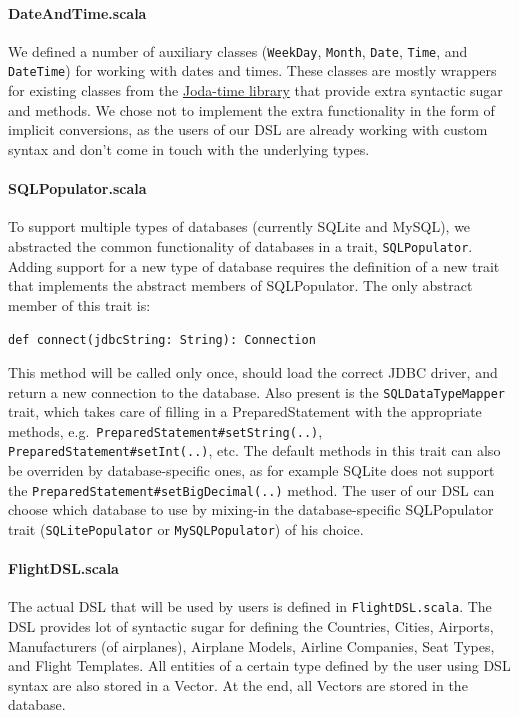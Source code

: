 \documentclass[a4paper]{article}
\newcommand{\cc}[1]{\texttt{#1}}
\renewcommand{\sc}[1]{\lstinline{#1}}
\begin{document}
\paragraph{DateAndTime.scala}
We defined a number of auxiliary classes (\cc{WeekDay}, \cc{Month}, \cc{Date}, \cc{Time}, and \cc{DateTime}) for working with dates and times.
These classes are mostly wrappers for existing classes from the \href{http://joda-time.sourceforge.net/}{Joda-time library} that provide extra syntactic sugar and methods.
We chose not to implement the extra functionality in the form of implicit conversions, as the users of our DSL are already working with custom syntax and don't come in touch with the underlying types.

\paragraph{SQLPopulator.scala}
To support multiple types of databases (currently SQLite and MySQL), we abstracted the common functionality of databases in a trait, \cc{SQL\-Populator}.
Adding support for a new type of database requires the definition of a new trait that implements the abstract members of SQLPopulator.
The only abstract member of this trait is:

\sc{def connect(jdbcString: String): Connection}

This method will be called only once, should load the correct JDBC driver, and return a new connection to the database.
Also present is the \cc{SQLDataTypeMapper} trait, which takes care of filling in a PreparedStatement with the appropriate methods, e.g.\ \cc{Prepared\-State\-ment\-\#set\-String(..)}, \cc{Prepared\-State\-ment\-\#set\-Int(..)}, etc.
The default methods in this trait can also be overriden by database-specific ones, as for example SQLite does not support the \cc{Prepared\-State\-ment\-\#set\-Big\-Decimal(..)} method.
The user of our DSL can choose which database to use by mixing-in the database-specific SQLPopulator trait (\cc{SQLitePopulator} or \cc{MySQL\-Populator}) of his choice.

\paragraph{FlightDSL.scala}
The actual DSL that will be used by users is defined in \cc{Flight\-DSL.scala}.
The DSL provides lot of syntactic sugar for defining the Countries, Cities, Airports, Manufacturers (of airplanes), Airplane Models, Airline Companies, Seat Types, and Flight Templates.
All entities of a certain type defined by the user using DSL syntax are also stored in a Vector.
At the end, all Vectors are stored in the database.
\end{document}
